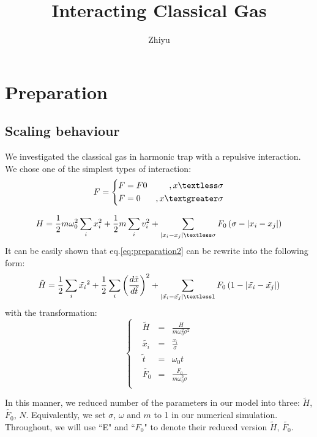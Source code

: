 \documentclass[a4paper,onecolumn,12pt]{article}
\begin{document}
 \title{Interacting Classical Gas}
 \author{Zhiyu}
 \maketitle
 \tableofcontents
 \newpage

\section{Preparation}
\subsection{Scaling behaviour}
We investigated the classical gas in harmonic trap with a repulsive interaction. We chose one of the simplest types of interaction:
\begin{equation}
F=\left\lbrace
\begin{aligned}
&F=F0 	&,x\textless\sigma\\
&F=0 	&,x\textgreater\sigma
\end{aligned}
\right.
\label{eq:preparation1}
\end{equation}


\begin{equation}
H=\frac{1}{2}m\omega_0^2\sum_{i}x_i^2+\frac{1}{2}m\sum_i v_i^2+\sum_{\left|x_i-x_j\right|\textless\sigma}F_0\left(\sigma-\left|x_i-x_j\right|\right)
\label{eq:preparation2}
\end{equation}
It can be easily shown that eq.\ref{eq:preparation2} can be rewrite into the following form:
\begin{equation}
\tilde{H}=\frac{1}{2}\sum_{i}\tilde{x_i}^2+\frac{1}{2}\sum_i\left(\frac{d\tilde{x}}{d\tilde{t}}\right)^2+\sum_{\left|\tilde{x_i}-\tilde{x_j}\right|\textless 1}F_0\left(1-\left|\tilde{x_i}-\tilde{x_j}\right|\right)
\end{equation}
with the transformation:
\begin{equation}
\left\lbrace
\begin{aligned}
&\tilde{H}&=&\frac{H}{m\omega_0^2\sigma^2}\\
&\tilde{x_i}&=&\frac{x_i}{\sigma}\\
&\tilde{t}&=&\omega_0t\\
&\tilde{F_0}&=&\frac{F_0}{m\omega_0^2\sigma}\\
\end{aligned}
\right.
\end{equation}

In this manner, we reduced number of the parameters in our model into three: $\tilde{H}$, $\tilde{F_0}$, $N$. Equivalently, we set $\sigma$, $\omega$ and $m$ to 1 in our numerical simulation. Throughout, we will use ``E" and ``$F_0$" to denote their reduced version  $\tilde{H}$, $\tilde{F_0}$.
\end{document}
